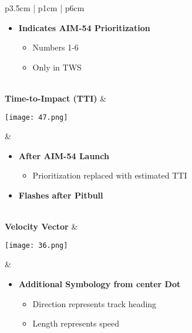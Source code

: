 \documentclass[8pt,usenames,dvipsnames,twoside]{article}
\begin{document}
\begin{center}
\begin{longtable}{p{3.5cm} | p{1cm} |  p{6cm}}
				\begin{minipage}[t]{\linewidth}
					\vspace{-7pt}
					\begin{itemize}
						\item \textbf{Indicates AIM-54 Prioritization}
						\begin{itemize}
							\item Numbers 1-6
							\item Only in TWS
						\end{itemize}
					\end{itemize}
				\end{minipage} \\
				\midrule
				\textbf{Time-to-Impact (TTI)} &
				\begin{minipage}[t]{\linewidth}
					\vspace{-7pt}
					\centering
					\texttt{[image: 47.png]}
				\end{minipage} &  
				\begin{minipage}[t]{\linewidth}
					\vspace{-7pt}
					\begin{itemize}
						\item \textbf{After AIM-54 Launch}
						\begin{itemize}
							\item Prioritization replaced with estimated TTI
						\end{itemize}
						\item \textbf{Flashes after Pitbull}
					\end{itemize}
				\end{minipage} \\
				\midrule
				\textbf{Velocity Vector} &
				\begin{minipage}[t]{\linewidth}
					\vspace{-7pt}
					\centering
					\texttt{[image: 36.png]}
				\end{minipage} &  
				\begin{minipage}[t]{\linewidth}
					\vspace{-7pt}
					\begin{itemize}
						\item \textbf{Additional Symbology from center Dot}
						\begin{itemize}
							\item Direction represents track heading
							\item Length represents speed
						\end{itemize}

\end{itemize}
\end{minipage}
\end{longtable}
\end{center}
\end{document}
